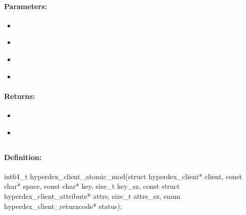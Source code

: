\paragraph{Parameters:}
\begin{itemize}[noitemsep]
\item {}\\

\item {}\\

\item {}\\

\item {}\\

\end{itemize}

\paragraph{Returns:}
\begin{itemize}[noitemsep]
\item {}\\

\item {}\\

\end{itemize}

\pagebreak
\subsection{}
\label{api:c:atomic_mod}


\paragraph{Definition:}
\begin{ccode}
int64_t hyperdex_client_atomic_mod(struct hyperdex_client* client,
        const char* space,
        const char* key, size_t key_sz,
        const struct hyperdex_client_attribute* attrs, size_t attrs_sz,
        enum hyperdex_client_returncode* status);
\end{ccode}

